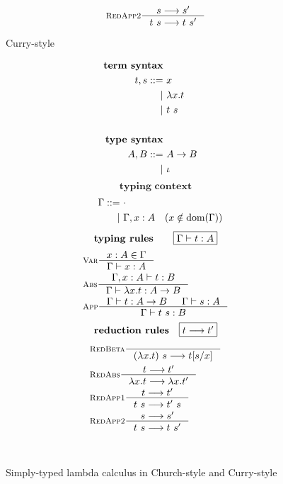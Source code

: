 \begin{figure}
\begin{singlespace}
\begin{minipage}{.46\textwidth}
\begin{align*}
& \inference[\sc RedApp2]{s --> s'}{t~s --> t~s'} \\
\end{align*}
\end{minipage}
\begin{minipage}{.46\textwidth}
	\begin{center}Curry-style\end{center}
\def\baselinestretch{0}
\small
\begin{align*}
\textbf{term syntax} \\
t,s ::= &~ x           \\
      | &~ \lambda x    . t \\
      | &~ t ~ s       \\
\\
\textbf{type syntax} \\
A,B ::= &~ A -> B \\
      | &~ \iota  \\
\end{align*}
\[ \textbf{typing context} \]\vspace*{-1em}
\begin{align*}\quad
\Gamma ::= &~ \cdot \\
	 | &~ \Gamma, x:A \quad (x\notin \mathop{\textrm{dom}}(\Gamma)) \\
\end{align*}
\[ \textbf{typing rules}
	\qquad \framebox{$\Gamma |- t : A$} \]
\vspace*{-1em}
\begin{align*}
& \inference[\sc Var]{x:A \in \Gamma}{\Gamma |- x:A} \\
& \inference[\sc Abs]{\Gamma,x:A |- t : B}
		     {\Gamma |- \l x   .t : A -> B} \\
& \inference[\sc App]{\Gamma |- t : A -> B & \Gamma |- s : A}
		     {\Gamma |- t~s : B} \\
\end{align*}
\[ \textbf{reduction rules}
	\quad \framebox{$t --> t'$} \]
\vspace*{-1em}
\begin{align*}
& \inference[\sc RedBeta]{}{(\l x   .t)~s --> t[s/x]} \\
& \inference[\sc RedAbs]{t --> t'}{\l x   .t --> \l x   .t'} \\
& \inference[\sc RedApp1]{t --> t'}{t~s --> t'~s} \\
& \inference[\sc RedApp2]{s --> s'}{t~s --> t~s'} \\
\end{align*}
\end{minipage}
~\\
\caption{Simply-typed lambda calculus in Church-style and Curry-style}
\label{fig:stlc}
\end{singlespace}
\end{figure}

